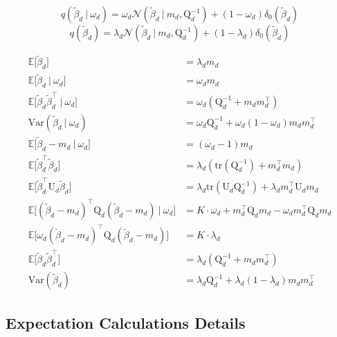 \documentclass[twoside,11pt]{article}
\newcommand\given[1][]{\:#1\vert\:}
\newcommand{\transpose}[1]{#1^{\intercal}}
\newcommand{\E}{\mathbb{E}}
\newcommand{\betad}{\tilde{\beta}_d}
\newcommand{\umat}{\mathrm{U}}
\newcommand{\qmat}{\mathrm{Q}}
\newcommand{\qbeta}{\mathcal{N} \left( \betad \given m_d, \qmat_d^{-1} \right)}
\newcommand{\trace}[1]{\mathrm{tr} \left( #1 \right)}
\newcommand{\var}[1]{\mathrm{Var}\left(#1\right)}
\begin{document}
\begin{equation} \label{eq:qbeta_omega}
	q(\betad \given \omega_d) = \omega_d \qbeta + (1 - \omega_d) \delta_0(\betad)
\end{equation}
\begin{equation}  \label{eq:qbeta_marginal}
	q(\betad) = \lambda_d \qbeta + (1 - \lambda_d) \delta_0(\betad)
\end{equation}

\begin{align*}
	\E \Big[ \betad \Big] &= \lambda_d m_d \\
	\E \Big[ \betad \given \omega_d \Big] &=  \omega_d m_d \\
	\E \Big[ \betad \transpose{\betad} \given \omega_d \Big] &= \omega_d \left( \qmat_d^{-1} + m_d \transpose{m_d} \right) \\
	\var{\betad \given \omega_d} &= \omega_d \qmat_d^{-1} + \omega_d(1-\omega_d) m_d \transpose{m_d} \\
	\E\Big[ \betad - m_d \given \omega_d \Big] &= (\omega_d - 1) m_d \\
	\E \Big[ \transpose{\betad} \betad \Big] &= \lambda_d \left( \trace{\qmat_d^{-1}} + \transpose{m_d} m_d \right) \\
	\E \Big[ \transpose{\betad} \umat_d \betad \Big] &= \lambda_d \trace{\umat_d \qmat_d^{-1}} + \lambda_d \transpose{m_d} \umat_d m_d \\
	\E \Big[ \transpose{(\betad - m_d)} \qmat_{d}(\betad - m_d) \given \omega_d \Big] &= K \cdot \omega_d + \transpose{m_d}\qmat_d m_d - \omega_d \transpose{m_d}\qmat_d m_d\\
	\E \Big[ \omega_d \transpose{(\betad - m_d)} \qmat_{d}(\betad - m_d) \Big] &= K \cdot \lambda_d \\
	\E \Big[ \betad \transpose{\betad} \Big] &=  \lambda_d \left( \qmat_d^{-1} + m_d \transpose{m_d} \right) \\
	\var{\betad} &= \lambda_d \qmat_d^{-1} + \lambda_d(1 - \lambda_d) m_d \transpose{m_d}
\end{align*}

\subsection{Expectation Calculations Details}
\end{document}

